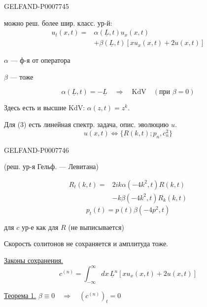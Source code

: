 \begin{GelfandAdjacentEvidence}{GELFAND-P000774}{5}


можно реш. более шир. класс. ур-й:
\begin{equation}
\begin{split}
u_t(x,t)={}&\alpha(\underline L,t)u_x(x,t)\\
&+\beta(\underline L,t)[xu_x(x,t)+2u(x,t)]
\end{split}\tag{3}
\end{equation}

\(\alpha\) --- ф-я от оператора

\(\beta\) --- тоже

\[
\alpha(\underline L,t)=-\underline L\quad\Rightarrow\quad
\mathrm{KdV}\quad(\text{при }\beta=0)
\]

Здесь есть и высшие KdV: \(\alpha(z,t)=z^k\).

Для (3) есть линейная спектр. задача, опис. эволюцию \(u\).
\[
u(x,t)\Longleftrightarrow\{R(k,t);p_n,c_n^2\}
\]
\end{GelfandAdjacentEvidence}
\begin{GelfandAdjacentEvidence}{GELFAND-P000774}{6}

(реш. ур-я Гельф. --- Левитана)

\begin{equation}
\begin{split}
R_t(k,t)={}&2ik\alpha(-4k^2,t)R(k,t)\\
&-k\beta(-4k^2,t)R_k(k,t)
\end{split}\tag{4}
\end{equation}
\begin{equation}
p_t(t)=p(t)\beta(-4p^2,t)\tag{4'}
\end{equation}
\end{GelfandAdjacentEvidence}


для \(c\) ур-е как для \(R\) (не выписывается)

Скорость солитонов не сохраняется и амплитуда тоже.

\underline{Законы сохранения.}
\begin{equation}
c^{(n)}=\int_{-\infty}^{\infty}dx\,\underline L^n[xu_x(x,t)+2u(x,t)]\tag{5}
\end{equation}

\underline{Теорема 1.} \(\beta\equiv0\quad\Rightarrow\quad(c^{(n)})_t=0\)

